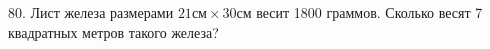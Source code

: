 80. Лист железа размерами $21\text{см}\times30\text{см}$ весит 1800 граммов. Сколько весят 7 квадратных метров такого железа?\\
